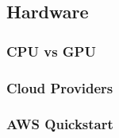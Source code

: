 \subsection{Hardware}

\subsubsection{CPU vs GPU}

\subsubsection{Cloud Providers}

\subsubsection{AWS Quickstart}